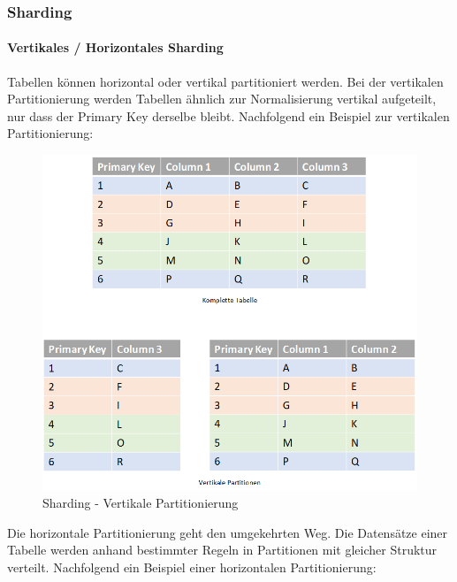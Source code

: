 
\begin{flushleft}
    \subsubsection{Sharding}
    \paragraph{Vertikales / Horizontales Sharding}
    Tabellen können horizontal oder vertikal partitioniert werden.
    Bei der vertikalen Partitionierung werden Tabellen ähnlich zur Normalisierung vertikal aufgeteilt, nur dass der Primary Key derselbe bleibt.
    Nachfolgend ein Beispiel zur vertikalen Partitionierung:
    \begin{figure}[H]
        \centering
        \includegraphics[width=0.8\linewidth]{source/implementation/evaluation/excursus_architecture/sharding_vertical_partitioning}
        \caption{Sharding - Vertikale Partitionierung}
        \label{fig:sharding_vertical_partitioning}
    \end{figure}
    \clearpage
    Die horizontale Partitionierung geht den umgekehrten Weg.
    Die Datensätze einer Tabelle werden anhand bestimmter Regeln in Partitionen mit gleicher Struktur verteilt.
    Nachfolgend ein Beispiel einer horizontalen Partitionierung:
    \begin{figure}[H]
        \centering

\end{figure}
\end{flushleft}
